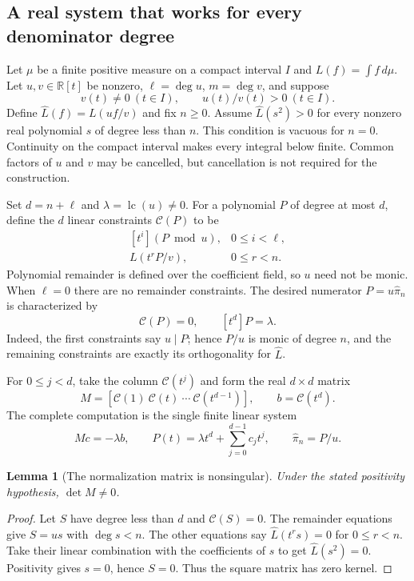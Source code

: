 \documentclass[11pt,a4paper]{article}
\newtheorem{lemma}[theorem]{Lemma}
\theoremstyle{definition}
\begin{document}
\subsection{A real system that works for every denominator degree}

Let $\mu$ be a finite positive measure on a compact interval $I$ and
$L(f)=\int f\,d\mu$. Let $u,v\in\mathbb R[t]$ be nonzero,
$\ell=\deg u$, $m=\deg v$, and suppose
\[
 v(t)\ne0\ (t\in I),\qquad u(t)/v(t)>0\ (t\in I).
\]
Define $\widehat L(f)=L(uf/v)$ and fix $n\ge0$. Assume
$\widehat L(s^2)>0$ for every nonzero real polynomial $s$ of degree
less than $n$. This condition is vacuous for $n=0$.
Continuity on the compact interval makes every integral below finite.
Common factors of $u$ and $v$ may be cancelled, but cancellation is
not required for the construction.

Set $d=n+\ell$ and $\lambda=\operatorname{lc}(u)\ne0$.
For a polynomial $P$ of degree at most $d$, define the $d$ linear
constraints $\mathcal C(P)$ to be
\[
 \begin{array}{ll}
 [t^i](P\bmod u),&0\le i<\ell,\\[2pt]
 L(t^rP/v),&0\le r<n.
 \end{array}
 \tag{CU1}
\]
Polynomial remainder is defined over the coefficient field, so $u$
need not be monic. When $\ell=0$ there are no remainder constraints.
The desired numerator $P=u\widehat\pi_n$ is characterized by
\[
 \mathcal C(P)=0,\qquad [t^d]P=\lambda.
 \tag{CU2}
\]
Indeed, the first constraints say $u\mid P$; hence $P/u$ is monic
of degree $n$, and the remaining constraints are exactly its
orthogonality for $\widehat L$.

For $0\le j<d$, take the column $\mathcal C(t^j)$ and form the real
$d\times d$ matrix
\[
 M=[\mathcal C(1)\ \mathcal C(t)\ \cdots\ \mathcal C(t^{d-1})],
 \qquad b=\mathcal C(t^d).
\]
The complete computation is the single finite linear system
\[
 M c=-\lambda b,\qquad
 P(t)=\lambda t^d+\sum_{j=0}^{d-1}c_jt^j,
 \qquad \widehat\pi_n=P/u.
 \tag{CU3}
\]

\begin{lemma}[The normalization matrix is nonsingular]
Under the stated positivity hypothesis, $\det M\ne0$.
\end{lemma}
\begin{proof}
Let $S$ have degree less than $d$ and $\mathcal C(S)=0$.
The remainder equations give $S=us$ with $\deg s<n$.
The other equations say $\widehat L(t^rs)=0$ for $0\le r<n$.
Take their linear combination with the coefficients of $s$ to get
$\widehat L(s^2)=0$. Positivity gives $s=0$, hence $S=0$.
Thus the square matrix has zero kernel.
\end{proof}
\end{document}
